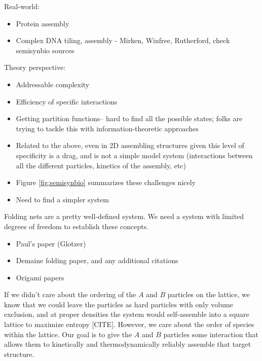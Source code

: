 
Real-world:
\begin{itemize}
\item Protein assembly
\item Complex DNA tiling, assembly - Mirken, Winfree, Rutherford, check semisynbio sources
\end{itemize}


Theory perspective:
\begin{itemize}
\item Addressable complexity
\item Efficiency of specific interactions
\end{itemize}



\begin{itemize}
\item Getting partition functions-- hard to find all the possible states; folks are trying to tackle this with information-theoretic approaches
\item Related to the above, even in 2D assembling structures given this level of specificity is a drag, and is not a simple model system (interactions between all the different particles, kinetics of the assembly, etc)
\item Figure \ref{fig:semisynbio} summarizes these challenges nicely
\item Need to find a simpler system
\end{itemize}


Folding nets are a pretty well-defined system. We need a system with limited degrees of freedom to establish these concepts.
\begin{itemize}
\item Paul's paper (Glotzer)
\item Demaine folding paper, and any additional citations
\item Origami papers
\end{itemize}




If we didn't care about the ordering of the $A$ and $B$ particles on the lattice, we know that we could leave the particles as hard particles with only volume exclusion, and at proper densities the system would self-assemble into a square lattice to maximize entropy [CITE].
However, we care about the order of species within the lattice.
Our goal is to give the $A$ and $B$ particles some interaction that allows them to kinetically and thermodynamically reliably assemble that target structure.

